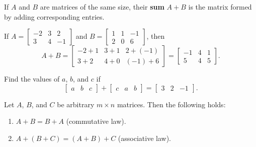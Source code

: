 \documentclass[20pt,a4paper]{extarticle}
\newcounter{example}[section]
\newcounter{theorem}
\newcounter{definition}[section]
\begin{document}
\begin{definition}
If $A$ and $B$ are matrices of the same size, their \textbf{sum} $A + B$ is the matrix formed by adding corresponding entries.
\end{definition}

\begin{example}
If $A = \begin{bmatrix} -2 & 3 & 2 \\ 3 & 4 & -1 \end{bmatrix}$ and $B = \begin{bmatrix} 1 & 1 & -1 \\ 2 & 0 & 6 \end{bmatrix}$, then
	\[
		A + B = \begin{bmatrix} -2 + 1 & 3 + 1 & 2 + (-1) \\ 3 + 2 & 4 + 0 & (-1) + 6 \end{bmatrix} = \begin{bmatrix} -1 & 4 & 1 \\ 5 & 4 & 5 \end{bmatrix} .
	\]
\end{example}

\vspace*{12pt}

\begin{example}
Find the values of $a$, $b$, and $c$ if 
	\[
		\begin{bmatrix} a & b & c \end{bmatrix} + \begin{bmatrix} c & a & b \end{bmatrix} = \begin{bmatrix} 3 & 2 & -1 \end{bmatrix}.
	\]
\end{example}

\begin{solution}

\end{solution}

\newpage 

\begin{theorem}
Let $A$, $B$, and $C$ be arbitrary $m \times n$ matrices. Then the following holds:
	\begin{enumerate}
		\item $A + B = B + A$ (commutative law).
		\item $A + (B + C) = (A + B) + C$ (associative law).
	\end{enumerate}
\end{theorem}
\end{document}
